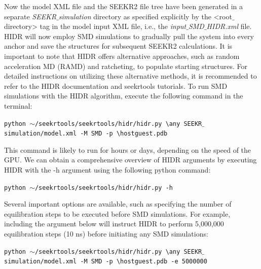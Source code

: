 \documentclass[9pt,training,pubversion]{livecoms}
\begin{document}
\vspace{2mm}

\noindent Now the model XML file and the SEEKR2 file tree have been generated in a separate \textit{SEEKR$\_$simulation} directory as specified explicitly by the <root$\_$directory> tag in the model input XML file, i.e., the \textit{input$\_$SMD$\_$HIDR.xml} file. HIDR will now employ SMD simulations to gradually pull the system into every anchor and save the structures for subsequent SEEKR2 calculations. It is important to note that HIDR offers alternative approaches, such as random acceleration MD (RAMD) and ratcheting, to populate starting structures. For detailed instructions on utilizing these alternative methods, it is recommended to refer to the HIDR documentation and seekrtools tutorials. To run SMD simulations with the HIDR algorithm, execute the following command in the terminal:

\begin{tcolorbox}[colback=black!8!white, colframe=black!50!black, fontlower=\tiny, left=2pt, right=2pt, top=2pt, bottom=2pt] 
\texttt{python $\sim$/seekrtools/seekrtools/hidr/hidr.py \textbackslash \linebreak any SEEKR$\_$simulation/model.xml -M SMD -p \textbackslash \linebreak hostguest.pdb}
\end{tcolorbox}

\noindent This command is likely to run for hours or days, depending on the speed of the GPU. We can obtain a comprehensive overview of HIDR arguments by executing HIDR with the -h argument using the following python command:

\begin{tcolorbox}[colback=black!8!white, colframe=black!50!black, fontlower=\tiny, left=2pt, right=2pt, top=2pt, bottom=2pt] 
\texttt{python $\sim$/seekrtools/seekrtools/hidr/hidr.py -h}
\end{tcolorbox}

\noindent Several important options are available, such as specifying the number of equilibration steps to be executed before SMD simulations. For example, including the argument below will instruct HIDR to perform 5,000,000 equilibration steps (10 ns) before initiating any SMD simulations:

\begin{tcolorbox}[colback=black!8!white, colframe=black!50!black, fontlower=\tiny, left=2pt, right=2pt, top=2pt, bottom=2pt] 
\texttt{python $\sim$/seekrtools/seekrtools/hidr/hidr.py \textbackslash \linebreak any SEEKR$\_$simulation/model.xml -M SMD -p \textbackslash \linebreak hostguest.pdb -e 5000000}
\end{tcolorbox}
\end{document}
